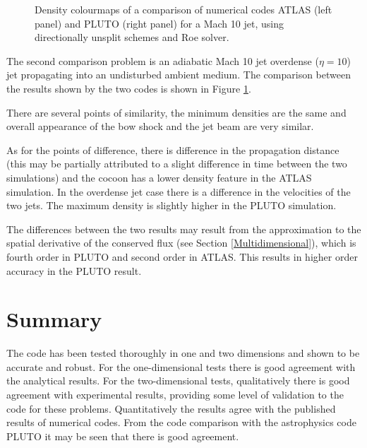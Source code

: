 \begin{figure}[t]
\begin{center}
\begin{minipage}[c]{.48\linewidth}
\end{minipage} \hfill
\caption{
Density colourmaps of a comparison of numerical codes ATLAS (left panel) and PLUTO (right panel) for a Mach 10 jet, using directionally unsplit schemes and Roe solver.
}
\label{fig:compjet2} %
\end{center}
\end{figure}

The second comparison problem is an adiabatic Mach 10 jet overdense ($\eta = 10$) jet propagating into an undisturbed ambient medium. 
The comparison between the results shown by the two codes is shown in Figure \ref{fig:compjet2}.

There are several points of similarity, the minimum densities are the same and overall appearance of the bow shock and the jet beam are very similar.

As for the points of difference, there is difference in the propagation distance
(this may be partially attributed to a slight difference in time between the two simulations)
 and the cocoon has a lower density feature in the ATLAS simulation.
In the overdense jet case there is a difference in the velocities of the two jets.
The maximum density is slightly higher in the PLUTO simulation.

The differences between the two results may result from the approximation to the spatial derivative of the conserved flux (see Section \ref{Multidimensional}), which is fourth order in PLUTO and second order in ATLAS. This results in higher order accuracy in the PLUTO result.


\section{Summary}
The code has been tested thoroughly in one and two dimensions and shown to be accurate and robust.
For the one-dimensional tests there is good agreement with the analytical results.
For the two-dimensional tests, qualitatively there is good agreement with experimental results, providing some level of validation to the code for these problems. Quantitatively the results agree with the published results of numerical codes.
From the code comparison with the astrophysics code PLUTO it may be seen that there is good agreement.

